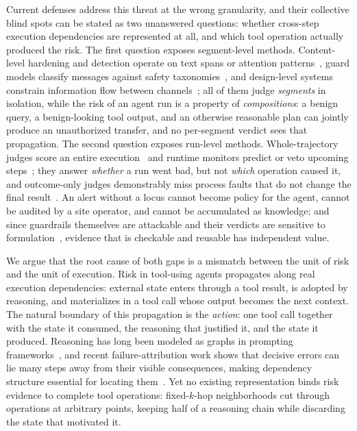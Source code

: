 Current defenses address this threat at the wrong granularity, and their collective blind spots can be stated as two unanswered questions: whether cross-step execution dependencies are represented at all, and which tool operation actually produced the risk. The first question exposes segment-level methods. Content-level hardening and detection operate on text spans or attention patterns~\cite{chen2024struq,chen2024secalign,zhong2025attention}, guard models classify messages against safety taxonomies~\cite{inan2023llama,liu2024calibration}, and design-level systems constrain information flow between channels~\cite{debenedetti2025defeating,zhu2025melon}; all of them judge \emph{segments} in isolation, while the risk of an agent run is a property of \emph{compositions}: a benign query, a benign-looking tool output, and an otherwise reasonable plan can jointly produce an unauthorized transfer, and no per-segment verdict sees that propagation. The second question exposes run-level methods. Whole-trajectory judges score an entire execution~\cite{yuan2024rjudge,zhuge2024agentasajudge,mohammadi2026trajectoryjudge} and runtime monitors predict or veto upcoming steps~\cite{luo2025agrail,wang2025probguard,lin2026dreamguard,mou2026toolsafe,liu2026agentdog}; they answer \emph{whether} a run went bad, but not \emph{which} operation caused it, and outcome-only judges demonstrably miss process faults that do not change the final result~\cite{mohammadi2026trajectoryjudge}. An alert without a locus cannot become policy for the agent, cannot be audited by a site operator, and cannot be accumulated as knowledge; and since guardrails themselves are attackable and their verdicts are sensitive to formulation~\cite{zhou2026from}, evidence that is checkable and reusable has independent value.

We argue that the root cause of both gaps is a mismatch between the unit of risk and the unit of execution. Risk in tool-using agents propagates along real execution dependencies: external state enters through a tool result, is adopted by reasoning, and materializes in a tool call whose output becomes the next context. The natural boundary of this propagation is the \emph{action}: one tool call together with the state it consumed, the reasoning that justified it, and the state it produced. Reasoning has long been modeled as graphs in prompting frameworks~\cite{yao2023tree,besta2023graph}, and recent failure-attribution work shows that decisive errors can lie many steps away from their visible consequences, making dependency structure essential for locating them~\cite{deng2026defa}. Yet no existing representation binds risk evidence to complete tool operations: fixed-$k$-hop neighborhoods cut through operations at arbitrary points, keeping half of a reasoning chain while discarding the state that motivated it.

